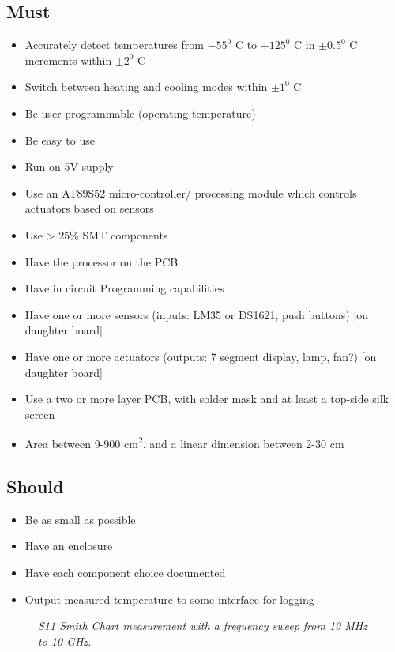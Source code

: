 \documentclass[11pt]{article}
\begin{document}
\subsection*{Must}
\begin{itemize}
    \item Accurately detect temperatures from $-55^0$ C to $+125^0$ C  in $\pm 0.5^0$ C increments within $\pm 2^0$ C
\item Switch between heating and cooling modes within $\pm 1^0$ C
\item Be user programmable (operating temperature)
\item Be easy to use
\item Run on 5V supply
\item Use an AT89S52 micro-controller/ processing module which controls actuators based on sensors
\item Use > 25\% SMT components
\item Have the processor on the PCB 
\item Have in circuit Programming capabilities
\item Have one or more sensors (inputs: LM35 or DS1621, push buttons) [on daughter board]
\item Have one or more actuators (outputs: 7 segment display, lamp, fan?) [on daughter board]
\item Use a two or more layer PCB, with solder mask and at least a top-side silk screen
\item Area between 9-900 cm\textsuperscript{2}, and a linear dimension between 2-30 cm
\end{itemize}

\subsection*{Should}

\begin{itemize}
    \item Be as small as possible
\item Have an enclosure
\item Have each component choice documented
\item Output measured temperature to some interface for logging
\end{itemize}
		
		\begin{figure}[H]
	\centering	
	\caption{\textit{S11 Smith Chart measurement with a frequency sweep from 10 MHz to 10 GHz.}}	
	\end{figure}
\end{document}
